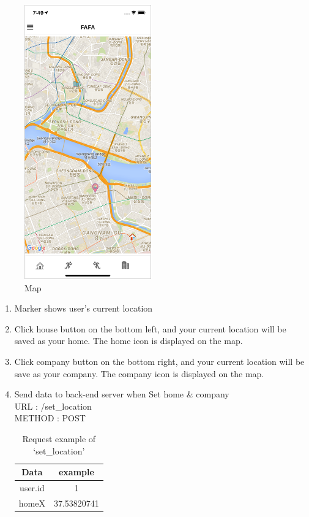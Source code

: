 \documentclass[conference]{IEEEtran}
\begin{document}
\begin{enumerate}
\begin{figure}[htbp]
    \centerline{\includegraphics{images/f2.png}}
    \caption{Map}
    \end{figure}
    \begin{enumerate}
        \item Marker shows user’s current location\\
        \item Click house button on the bottom left, and your current location will be saved as your home. The home icon is displayed on the map.\\
        \item Click company button on the bottom right, and your current location will be save as your company. The company icon is displayed on the map.\\
        \item Send data to back-end server when Set home & company\\
        URL : /set\_location\\
        METHOD : POST
        \begin{table}[htbp]
        \caption{Request example of ‘set\_location’}
        \begin{center}
        \begin{tabular}{|c|c|}
        \hline
        Data     & example \\ \hline
        user.id  & 1       \\ \hline
        homeX    & 37.53820741       \\ \hline

\end{tabular}
\end{center}
\end{table}
\end{enumerate}
\end{enumerate}
\end{document}
